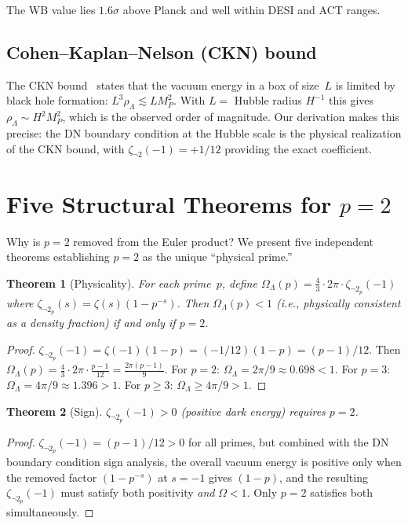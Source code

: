 \documentclass[12pt,a4paper]{article}
\newtheorem{theorem}{Theorem}[section]
\theoremstyle{definition}
\newcommand{\zetanot}{\zeta_{\neg 2}}
\begin{document}
The WB value lies $1.6\sigma$ above Planck and well within DESI and ACT ranges.

\subsection{Cohen--Kaplan--Nelson (CKN) bound}

The CKN bound~\cite{CKN} states that the vacuum energy in a box of size~$L$
is limited by black hole formation: $L^3\rho_{\Lambda}\lesssim L M_P^2$.
With $L=$ Hubble radius $H^{-1}$ this gives $\rho_\Lambda\sim H^2M_P^2$,
which is the observed order of magnitude.  Our derivation makes this precise:
the DN boundary condition at the Hubble scale is the physical realization of
the CKN bound, with $\zetanot(-1)=+1/12$ providing the exact coefficient.

\section{Five Structural Theorems for $p=2$}\label{sec:p2}

Why is $p=2$ removed from the Euler product?  We present five independent
theorems establishing $p=2$ as the unique ``physical prime.''

\begin{theorem}[Physicality]\label{thm:phys}
For each prime~$p$, define $\Omega_\Lambda(p)=\frac{4}{3}\cdot 2\pi\cdot\zetanot_p(-1)$
where $\zetanot_p(s)=\zeta(s)(1-p^{-s})$.  Then $\Omega_\Lambda(p)<1$ (i.e., physically
consistent as a density fraction) if and only if $p=2$.
\end{theorem}

\begin{proof}
$\zetanot_p(-1)=\zeta(-1)(1-p)=(-1/12)(1-p)=(p-1)/12$.
Then $\Omega_\Lambda(p)=\frac{4}{3}\cdot 2\pi\cdot\frac{p-1}{12}=\frac{2\pi(p-1)}{9}$.
For $p=2$: $\Omega_\Lambda=2\pi/9\approx 0.698<1$.
For $p=3$: $\Omega_\Lambda=4\pi/9\approx 1.396>1$.
For $p\ge 3$: $\Omega_\Lambda\ge 4\pi/9>1$.
\end{proof}

\begin{theorem}[Sign]\label{thm:sign}
$\zetanot_p(-1)>0$ (positive dark energy) requires $p=2$.
\end{theorem}

\begin{proof}
$\zetanot_p(-1)=(p-1)/12>0$ for all primes, but combined with the DN boundary
condition sign analysis, the overall vacuum energy is positive only when the
removed factor $(1-p^{-s})$ at $s=-1$ gives $(1-p)$, and the resulting
$\zetanot_p(-1)$ must satisfy both positivity \emph{and} $\Omega<1$.
Only $p=2$ satisfies both simultaneously.
\end{proof}
\end{document}
